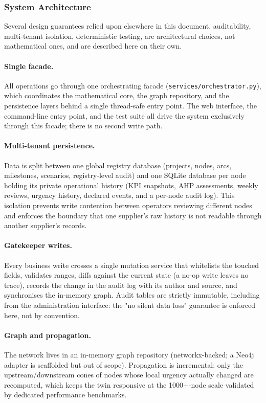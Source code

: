 \subsubsection{System Architecture}
\label{sec:architecture}

Several design guarantees relied upon elsewhere in this document, auditability, multi-tenant isolation, deterministic testing, are architectural choices, not mathematical ones, and are described here on their own.

\paragraph{Single facade.} All operations go through one orchestrating facade
(\texttt{services/}\allowbreak\texttt{orchestrator.py}), which coordinates the mathematical core, the
graph repository, and the persistence layers behind a single thread-safe entry
point. The web interface, the command-line entry point, and the test suite all
drive the system exclusively through this facade; there is no second write path.

\paragraph{Multi-tenant persistence.} Data is split between one global registry
database (projects, nodes, arcs, milestones, scenarios, registry-level audit) and
one SQLite database per node holding its private operational history (KPI
snapshots, AHP assessments, weekly reviews, urgency history, declared events, and
a per-node audit log). This isolation prevents write contention between operators
reviewing different nodes and enforces the boundary that one supplier's raw
history is not readable through another supplier's records.

\paragraph{Gatekeeper writes.} Every business write crosses a single mutation
service that whitelists the touched fields, validates ranges, diffs against the
current state (a no-op write leaves no trace), records the change in the audit
log with its author and source, and synchronises the in-memory graph. Audit
tables are strictly immutable, including from the administration interface:
the "no silent data loss" guarantee is enforced here, not by convention.

\paragraph{Graph and propagation.} The network lives in an in-memory graph
repository (networkx-backed; a Neo4j adapter is scaffolded but out of scope).
Propagation is incremental: only the upstream/downstream cones of nodes whose
local urgency actually changed are recomputed, which keeps the twin responsive
at the 1000+-node scale validated by dedicated performance benchmarks.

